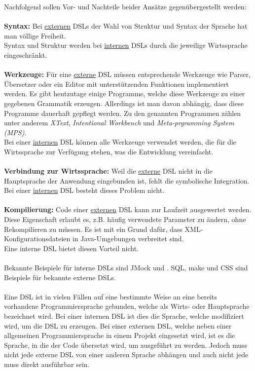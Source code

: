 Nachfolgend sollen Vor- und Nachteile beider Ansätze gegenübergestellt werden:
\\ \\
\textbf{Syntax:}
Bei \underline{externen} DSLs der Wahl von Struktur und Syntax der Sprache hat man völlige Freiheit.\\
Syntax und Struktur werden bei \underline{internen} DSLs durch die jeweilige Wirtssprache eingeschränkt.
\\ \\
\textbf{Werkzeuge:}
Für eine \underline{externe} DSL müssen entsprechende Werkzeuge wie Parser, Übersetzer oder ein Editor mit unterstützenden Funktionen implementiert 
werden. Es gibt heutzutage einige Programme, welche diese Werkzeuge zu einer gegebenen Grammatik erzeugen. Allerdings ist man davon abhängig, dass 
diese Programme dauerhaft gepflegt werden. Zu den genannten Programmen zählen unter anderem \emph{XText}\cite{www:xtext}, \emph{Intentional 
Workbench}\cite{www:intentsoft} und \emph{Meta-prgramming System (MPS)}\cite{www:mps}.\\
Bei einer \underline{internen} DSL können alle Werkzeuge verwendet werden, die für die Wirtssprache zur Verfügung stehen, was die Entwicklung vereinfacht.
\\ \\
\textbf{Verbindung zur Wirtssprache:}
Weil die \underline{externe} DSL nicht in die Hauptsprache der Anwendung eingebunden ist, fehlt die symbolische Integration\cite{www:fowlerWorkbench}.\\
Bei einer \underline{internen} DSL besteht dieses Problem nicht.
\\ \\
\textbf{Kompilierung:}
Code einer \underline{externen} DSL kann zur Laufzeit ausgewertet werden. Diese Eigenschaft erlaubt es, z.B. häufig verwendete Parameter zu ändern, ohne 
Rekompilieren zu müssen. Es ist mit ein Grund dafür, dass XML-Konfigurationsdateien in Java-Umgebungen verbreitet sind\cite{www:fowlerWorkbench}.\\
Eine interne DSL bietet diesen Vorteil nicht.
\\ \\ %
Bekannte Beispiele für interne DSLs sind JMock und . SQL, make und CSS sind Beispiele für bekannte externe DSLs.
\\ \\ %
Eine DSL ist in vielen Fällen auf eine bestimmte Weise an eine bereits vorhandene Programmiersprache gebunden, welche als Wirts- oder Hauptsprache bezeichnet wird. Bei einer internen DSL ist dies die Sprache, welche modifiziert wird, um die DSL zu erzeugen. Bei einer externen DSL, welche neben einer allgemeinen Programmiersprache in einem Projekt eingesetzt wird, ist es die Sprache, in die der Code übersetzt wird, um ausgeführt zu werden.
Jedoch muss nicht jede externe DSL von einer anderen Sprache abhängen und auch nicht jede muss direkt ausführbar sein\cite{paper:Mernik}.

